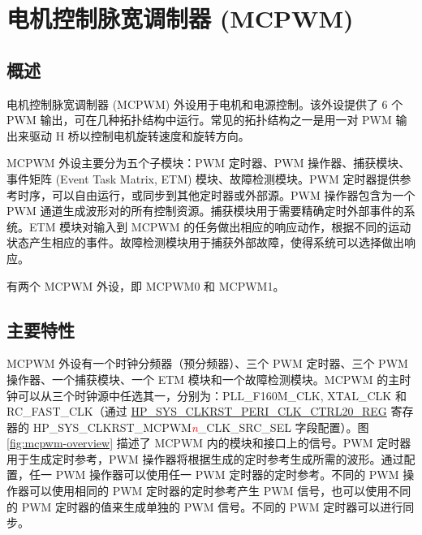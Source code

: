 \documentclass[main\_\_CN.tex]{subfiles}
\begin{document}

\ifglobal
\else
    {\let\clearpage\relax \listoftodos}
    {\let\clearpage\relax \listofdonetodos}
    \tableofcontents
\fi



\hypertarget{mcpwm}{}
\chapter{电机控制脉宽调制器 (MCPWM)}
\label{mod:mcpwm}


\section{概述}
电机控制脉宽调制器 (MCPWM) 外设用于电机和电源控制。该外设提供了 6 个 PWM 输出，可在几种拓扑结构中运行。常见的拓扑结构之一是用一对 PWM 输出来驱动 H 桥以控制电机旋转速度和旋转方向。

MCPWM 外设主要分为五个子模块：PWM 定时器、PWM 操作器、捕获模块、事件矩阵 (Event Task Matrix, ETM) 模块、故障检测模块。PWM 定时器提供参考时序，可以自由运行，或同步到其他定时器或外部源。PWM 操作器包含为一个 PWM 通道生成波形对的所有控制资源。捕获模块用于需要精确定时外部事件的系统。ETM 模块对输入到 MCPWM 的任务做出相应的响应动作，根据不同的运动状态产生相应的事件。故障检测模块用于捕获外部故障，使得系统可以选择做出响应。

\chipname{} 有两个 MCPWM 外设，即 MCPWM0 和 MCPWM1。

\section{主要特性}

MCPWM 外设有一个时钟分频器（预分频器）、三个 PWM 定时器、三个 PWM 操作器、一个捕获模块、一个 ETM 模块和一个故障检测模块。MCPWM 的主时钟可以从三个时钟源中任选其一，分别为：PLL\_F160M\_CLK, XTAL\_CLK 和 RC\_FAST\_CLK（通过 \hyperref[regdesc:HPSYSCLKRSTPERICLKCTRL20REG]{HP\_SYS\_CLKRST\_PERI\_CLK\_CTRL20\_REG} 寄存器的 HP\_SYS\_CLKRST\_MCPWM\textcolor{red}{\it{n}}\_CLK\_SRC\_SEL 字段配置）。图 \ref{fig:mcpwm-overview} 描述了 MCPWM 内的模块和接口上的信号。PWM 定时器用于生成定时参考，PWM 操作器将根据生成的定时参考生成所需的波形。通过配置，任一 PWM 操作器可以使用任一 PWM 定时器的定时参考。不同的 PWM 操作器可以使用相同的 PWM 定时器的定时参考产生 PWM 信号，也可以使用不同的 PWM 定时器的值来生成单独的 PWM 信号。不同的 PWM 定时器可以进行同步。
\end{document}
